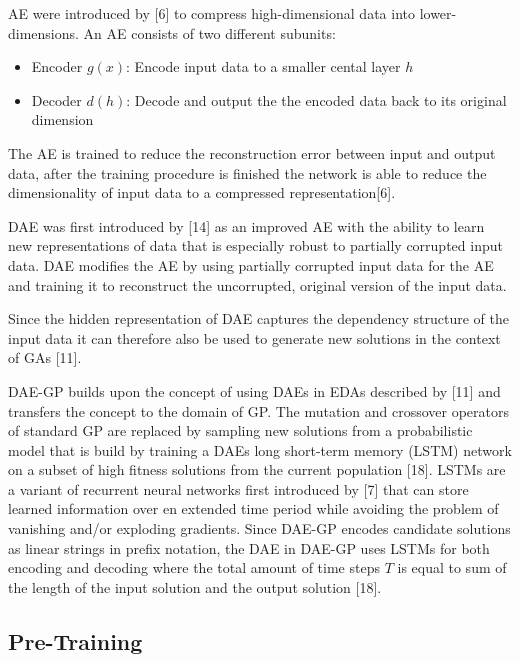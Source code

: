 \documentclass[
  11pt,
]{article}
\providecommand{\tightlist}{%
  \setlength{\itemsep}{0pt}\setlength{\parskip}{0pt}}
\begin{document}
AE were introduced by {[}6{]} to compress high-dimensional data into
lower-dimensions. An AE consists of two different subunits:

\begin{itemize}
\tightlist
\item
  Encoder \(g(x)\): Encode input data to a smaller cental layer \(h\)
\item
  Decoder \(d(h)\): Decode and output the the encoded data back to its
  original dimension
\end{itemize}

The AE is trained to reduce the reconstruction error between input and
output data, after the training procedure is finished the network is
able to reduce the dimensionality of input data to a compressed
representation{[}6{]}.

DAE was first introduced by {[}14{]} as an improved AE with the ability
to learn new representations of data that is especially robust to
partially corrupted input data. DAE modifies the AE by using partially
corrupted input data for the AE and training it to reconstruct the
uncorrupted, original version of the input data.

Since the hidden representation of DAE captures the dependency structure
of the input data it can therefore also be used to generate new
solutions in the context of GAs {[}11{]}.

DAE-GP builds upon the concept of using DAEs in EDAs described by
{[}11{]} and transfers the concept to the domain of GP. The mutation and
crossover operators of standard GP are replaced by sampling new
solutions from a probabilistic model that is build by training a DAEs
long short-term memory (LSTM) network on a subset of high fitness
solutions from the current population {[}18{]}. LSTMs are a variant of
recurrent neural networks first introduced by {[}7{]} that can store
learned information over en extended time period while avoiding the
problem of vanishing and/or exploding gradients. Since DAE-GP encodes
candidate solutions as linear strings in prefix notation, the DAE in
DAE-GP uses LSTMs for both encoding and decoding where the total amount
of time steps \(T\) is equal to sum of the length of the input solution
and the output solution {[}18{]}.

\hypertarget{pre-training}{%
\subsection{Pre-Training}\label{pre-training}}
\end{document}
